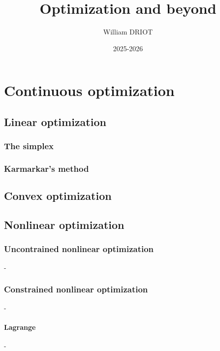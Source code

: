 \documentclass[12pt,openany,oneside]{book}
\title{\textbf{Optimization and beyond}}
\author{William DRIOT}
\date{2025-2026}
\theoremstyle{definition}
\numberwithin{definition}{section}
\numberwithin{theorem}{section}
\numberwithin{corollary}{section}
\numberwithin{proposition}{section}
\numberwithin{notation}{section}
\numberwithin{remark}{section}
\numberwithin{hypothesis}{section}
\numberwithin{example}{section}
\begin{document}
\maketitle

\tableofcontents

\setlength{\parindent}{15pt}
\setlength{\parskip}{6pt}

\newpage


% 
% 
% 
% 

\part{Continuous optimization}

\chapter{Linear optimization}

\section{The simplex}


\section{Karmarkar's method}

\chapter{Convex optimization}

\chapter{Nonlinear optimization}

\section{Uncontrained nonlinear optimization}-
\section{Constrained nonlinear optimization}-
\subsection{Lagrange}-
\end{document}
